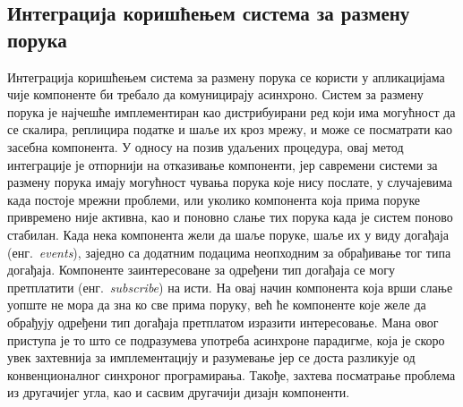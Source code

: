 \documentclass[12pt,oneside]{memoir}
\begin{document}
\subsection{Интеграција коришћењем система за размену порука}
Интеграција коришћењем система за размену порука се користи у апликацијама чије компоненте би требало да комуницирају асинхроно. Систем за размену порука је најчешће имплементиран као дистрибуирани ред који има могућност да се скалира, реплицира податке и шаље их кроз мрежу, и може се посматрати као засебна компонента. У односу на позив удаљених процедура, овај метод интеграције је отпорнији на отказивање компоненти, јер савремени системи за размену порука имају могућност чувања порука које нису послате, у случајевима када постоје мрежни проблеми, или уколико компонента која прима поруке привремено није активна, као и поновно слање тих порука када је систем поново стабилан. Када нека компонента жели да шаље поруке, шаље их у виду догађаја (енг.~\textit{events}), заједно са додатним подацима неопходним за обрађивање тог типа догађаја. Компоненте заинтересоване за одређени тип догађаја се могу претплатити (енг.~\textit{subscribe}) на исти. На овај начин компонента која врши слање уопште не мора да зна ко све прима поруку, већ ће компоненте које желе да обрађују одређени тип догађаја претплатом изразити интересовање. Мана овог приступа је то што се подразумева употреба асинхроне парадигме, која је скоро увек захтевнија за имплементацију и разумевање јер се доста разликује од конвенционалног синхроног програмирања. Такође, захтева посматрање проблема из другачијег угла, као и сасвим другачији дизајн компоненти.
\end{document}
